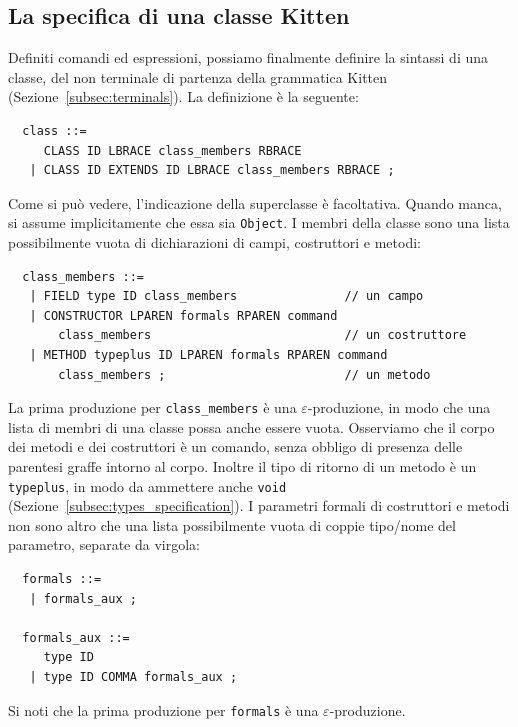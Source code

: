 \subsection{La specifica di una classe Kitten}
  \label{subsec:classes_specification}
%
Definiti comandi ed espressioni, possiamo finalmente definire la sintassi
di una classe, \cioe del non terminale di partenza della grammatica
Kitten (Sezione~\ref{subsec:terminals}). La definizione \`e la seguente:
%
\begin{verbatim}
  class ::=
     CLASS ID LBRACE class_members RBRACE
   | CLASS ID EXTENDS ID LBRACE class_members RBRACE ;
\end{verbatim}
%
Come si pu\`o vedere, l'indicazione della superclasse \`e facoltativa.
Quando manca, si assume implicitamente
che essa sia \texttt{Object}. I membri della
classe sono una lista possibilmente vuota di
dichiarazioni di campi, costruttori e metodi:
%
\begin{verbatim}
  class_members ::=
   | FIELD type ID class_members               // un campo
   | CONSTRUCTOR LPAREN formals RPAREN command
       class_members                           // un costruttore
   | METHOD typeplus ID LPAREN formals RPAREN command
       class_members ;                         // un metodo
\end{verbatim}
%
La prima produzione per \texttt{class\_members}
\`e una $\varepsilon$-produzione, in modo che
una lista di membri di una classe possa anche essere vuota.
Osserviamo che il corpo dei metodi e dei costruttori \`e un comando,
senza obbligo di presenza delle parentesi graffe intorno
al corpo. Inoltre il tipo di ritorno di un metodo \`e un
\texttt{typeplus}, in modo da ammettere anche \texttt{void}
(Sezione~\ref{subsec:types_specification}).
I parametri formali di costruttori e metodi non sono altro che una lista
possibilmente vuota di coppie tipo/nome del parametro, separate da virgola:
%
\begin{verbatim}
  formals ::=
   | formals_aux ;

  formals_aux ::=
     type ID
   | type ID COMMA formals_aux ;
\end{verbatim}
%
Si noti che la prima produzione per \texttt{formals} \`e una
$\varepsilon$-produzione.
%
